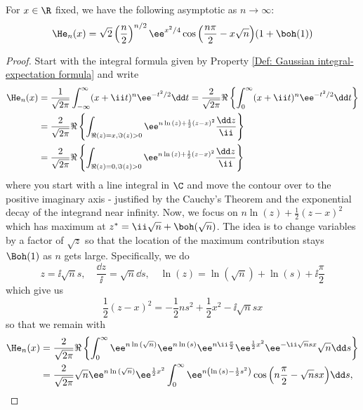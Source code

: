 {\begin{proposicao}
	For $x \in \R$ fixed, we have the following asymptotic as $n \rightarrow \infty$:
	\begin{equation}
		\He_n(x) = \sqrt{2} \left(\frac{n}{2}\right)^{n/2} \ee^{x^2/4} \cos{\left(\frac{n\pi}{2} - x \sqrt{n}\right)} (1 + \boh(1))
	\end{equation}
\end{proposicao}
\begin{proof}
	Start with the integral formula given by Property \ref{Def: Gaussian integral-expectation formula} and write
	\begin{align}
		\He_n(x) & = \frac{1}{\sqrt{2\pi}} \int_{-\infty}^{\infty} (x + \ii t)^n \ee^{-t^2/2} \dd t = \frac{2}{\sqrt{2\pi}} \Re\left\{ \int_{0}^{\infty} (x + \ii t)^n \ee^{-t^2/2} \dd t \right\} \\
		& = \frac{2}{\sqrt{2\pi}} \Re\left\{ \int_{\Re(z) = x, \Im(z)>0} \ee^{n\ln{(z)} + \frac{1}{2}(z-x)^2} \frac{\dd z}{\ii} \right\} \\
		& = \frac{2}{\sqrt{2\pi}} \Re\left\{ \int_{\Re(z) = 0, \Im(z)>0} \ee^{n\ln{(z)} + \frac{1}{2}(z-x)^2} \frac{\dd z}{\ii} \right\}
	\end{align}
	where you start with a line integral in $\C$ and move the contour over to the positive imaginary axis - justified by the Cauchy's Theorem and the exponential decay of the integrand near infinity. Now, we focus on $n\ln{(z)} + \frac{1}{2}(z-x)^2$ which has maximum at $z^* = \ii \sqrt{n} + \boh(\sqrt{n})$. The idea is to change variables by a factor of $\sqrt{z}$ so that the location of the maximum contribution stays $\Boh(1)$ as $n$ gets large. Specifically, we do
	\begin{equation}
		z = \ii \sqrt{n} s, \quad \frac{\dd z}{\ii} = \sqrt{n} \dd s, \quad \ln{(z)} = \ln{(\sqrt{n})} + \ln{(s)} + \ii \frac{\pi}{2}
	\end{equation}  
	which give us
	\begin{equation}
		\frac{1}{2}(z-x)^2 = -\frac{1}{2} ns^2 + \frac{1}{2} x^2 - \ii \sqrt{n} sx	
	\end{equation}
	so that we remain with
	\begin{align}
		\He_n(x) & = \frac{2}{\sqrt{2\pi}} \Re\left\{ \int_{0}^{\infty} \ee^{n\ln{(\sqrt{n})}} \ee^{n\ln{(s)}} \ee^{n\ii\frac{\pi}{2}} \ee^{\frac{1}{2}x^2}\ee^{-\ii\sqrt{n}sx} \sqrt{n} \dd s \right\} \\
		& = \frac{2}{\sqrt{2\pi}} \sqrt{n} \ee^{n\ln{(\sqrt{n})}} \ee^{\frac{1}{2}x^2}  \int_{0}^{\infty} \ee^{n\left(\ln{(s)} - \frac{1}{2}s^2 \right)} \cos{\left(n\frac{\pi}{2} - \sqrt{n} s x\right)} \dd s,

\end{align}
\end{proof}}
